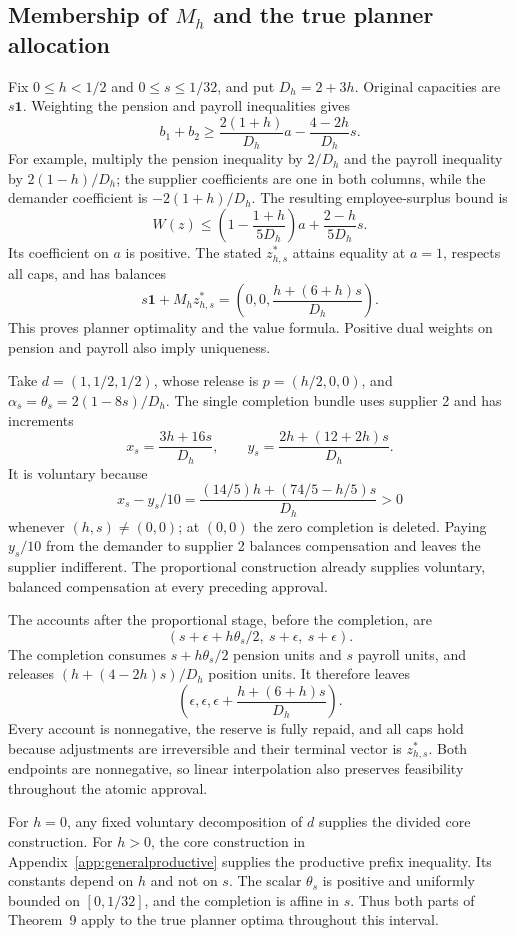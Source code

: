 \documentclass[ecta,draft,supplement]{econsocart}
\theoremstyle{definition}
\theoremstyle{definition}
\begin{document}
\begin{appendix}
\subsection{Membership of \texorpdfstring{$M_h$}{Mh} and the true planner allocation}

Fix $0\leq h<1/2$ and $0\leq s\leq1/32$, and put
$D_h=2+3h$. Original capacities are $s\mathbf1$.
Weighting the pension and payroll inequalities gives
\[
 b_1+b_2\geq
 \frac{2(1+h)}{D_h}a-\frac{4-2h}{D_h}s.
\]
For example, multiply the pension inequality by $2/D_h$
and the payroll inequality by $2(1-h)/D_h$; the supplier
coefficients are one in both columns, while the demander
coefficient is $-2(1+h)/D_h$.
The resulting employee-surplus bound is
\[
 W(z)\leq
 \left(1-\frac{1+h}{5D_h}\right)a+
 \frac{2-h}{5D_h}s.
\]
Its coefficient on $a$ is positive. The stated $z_{h,s}^*$
attains equality at $a=1$, respects all caps, and has balances
\[
 s\mathbf1+M_hz_{h,s}^*
   =\left(0,0,\frac{h+(6+h)s}{D_h}\right).
\]
This proves planner optimality and the value formula. Positive
dual weights on pension and payroll also imply uniqueness.

Take $d=(1,1/2,1/2)$, whose release is
$p=(h/2,0,0)$, and $\alpha_s=\theta_s=2(1-8s)/D_h$.
The single completion bundle uses supplier 2 and has increments
\[
 x_s=\frac{3h+16s}{D_h},\qquad
 y_s=\frac{2h+(12+2h)s}{D_h}.
\]
It is voluntary because
\[
 x_s-y_s/10
 =\frac{(14/5)h+(74/5-h/5)s}{D_h}>0
\]
whenever $(h,s)\ne(0,0)$; at $(0,0)$ the zero completion is
deleted. Paying $y_s/10$ from the demander to supplier 2
balances compensation and leaves the supplier indifferent.
The proportional construction already supplies voluntary,
balanced compensation at every preceding approval.

The accounts after the proportional stage, before the completion,
are
\[
 (s+\epsilon+h\theta_s/2,\ s+\epsilon,\ s+\epsilon).
\]
The completion consumes $s+h\theta_s/2$ pension units and
$s$ payroll units, and releases $(h+(4-2h)s)/D_h$ position
units. It therefore leaves
\[
 \left(\epsilon,\epsilon,
       \epsilon+\frac{h+(6+h)s}{D_h}\right).
\]
Every account is nonnegative, the reserve is fully repaid, and
all caps hold because adjustments are irreversible and their
terminal vector is $z_{h,s}^*$. Both endpoints are nonnegative, so linear interpolation also preserves
feasibility throughout the atomic approval.

For $h=0$, any fixed voluntary decomposition of $d$ supplies
the divided core construction. For $h>0$, the core construction
in Appendix~\ref{app:generalproductive} supplies the productive
prefix inequality. Its constants depend on $h$ and not on $s$.
The scalar $\theta_s$ is positive and uniformly bounded on
$[0,1/32]$, and the completion is affine in $s$.
Thus both parts of Theorem~9%
 apply to
the true planner optima throughout this interval.


\end{appendix}
\end{document}
